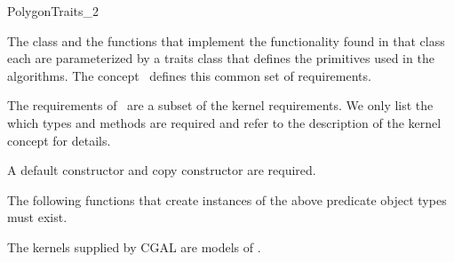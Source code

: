 

\begin{ccRefConcept}{PolygonTraits_2}


\ccDefinition

The  class and the functions that implement the functionality
found in that class each are parameterized by a traits class that defines the
primitives used in the algorithms.
The concept \ccRefName\ defines this common set of requirements.

The requirements of \ccRefName\ are a subset of the kernel requirements.
We only list the which types and methods are required and refer to the
description of the kernel concept for details.

\ccTypes


\ccCreation
{}  

A default constructor and copy constructor are required.

\ccOperations

The following functions that create instances of the above predicate object
types must exist.










\ccHasModels

The kernels supplied by CGAL are models of \ccRefName.

\ccSeeAlso


\end{ccRefConcept}



